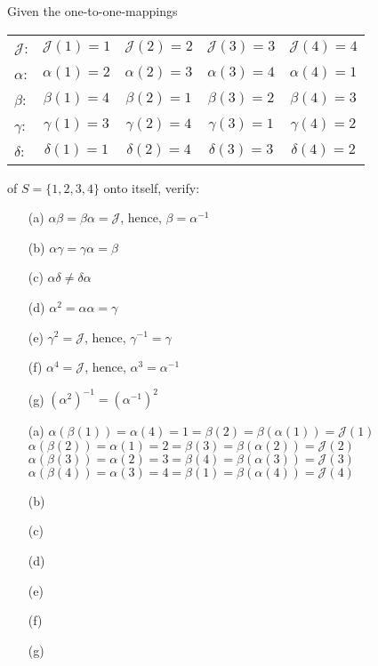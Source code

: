 \exercise
Given the one-to-one-mappings
\begin{center}
    \begin{tabular}{l c c c c}
        $\mathcal{J}$: & $\mathcal{J}(1) = 1$ & $\mathcal{J}(2) = 2$ & $\mathcal{J}(3) = 3$ & $\mathcal{J}(4) = 4$ \\
        $\alpha$: & $\alpha(1)=2$ & $\alpha(2)=3$ &$\alpha(3)=4$ &$\alpha(4)=1$ \\
        $\beta$: & $\beta(1) = 4$ &$\beta(2) = 1$ &$\beta(3) = 2$ &$\beta(4) = 3$ \\
        $\gamma$: & $\gamma(1) = 3$  &$\gamma(2) = 4$ &$\gamma(3) = 1$ &$\gamma(4) = 2$ \\
        $\delta$: & $\delta(1) = 1$ &$\delta(2) = 4$ &$\delta(3) = 3$ &$\delta(4) = 2$ \\
    \end{tabular}
\end{center}
of $S  = \{1, 2, 3, 4\}$ onto itself, verify:
\begin{itemize}
    \item[(a)]
        $\alpha\beta = \beta\alpha = \mathcal{J}$, hence, $\beta = \alpha^{-1}$
    \item[(b)]
        $\alpha\gamma = \gamma\alpha = \beta$
    \item[(c)]
        $\alpha\delta \neq \delta\alpha$
    \item[(d)]
        $\alpha^2 = \alpha\alpha = \gamma$
    \item[(e)]
        $\gamma^2=\mathcal{J}$, hence, $\gamma^{-1} = \gamma$ 
    \item[(f)]
        $\alpha^4 = \mathcal{J}$, hence, $\alpha^3=\alpha^{-1}$
    \item[(g)]
        $(\alpha^2)^{-1} = (\alpha^{-1})^2$
\end{itemize}

\answer
\begin{itemize}
    \item[(a)]
        $\alpha(\beta(1)) = \alpha(4) = 1 = \beta(2) = \beta(\alpha(1)) = \mathcal{J}(1) $\\
        $\alpha(\beta(2)) = \alpha(1) = 2 = \beta(3) = \beta(\alpha(2)) = \mathcal{J}(2)$\\
        $\alpha(\beta(3)) = \alpha(2) = 3 = \beta(4) = \beta(\alpha(3)) = \mathcal{J}(3)$\\
        $\alpha(\beta(4)) = \alpha(3) = 4 = \beta(1) = \beta(\alpha(4)) = \mathcal{J}(4)$
    \item[(b)]
    \item[(c)]
    \item[(d)]
    \item[(e)]
    \item[(f)]
    \item[(g)]
\end{itemize}

